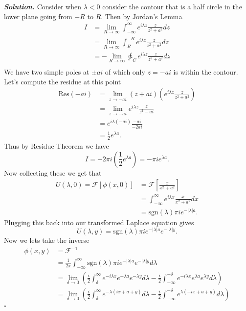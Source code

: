 \documentclass[12pt]{report}
\newenvironment{solution}[1][\it{Solution}]{\textbf{#1. } }{$\square$}
\def\F{{\mathcal{F}}}
\newcommand{\paren}[1]{{\left(#1\right)}} %
\def\ointcc{{\ointctrclockwise}} %
\begin{document}
\begin{solution}
    \noindent
    Consider when $\lambda < 0$ consider the contour that is a half circle in the lower plane going from $-R$ to $R$. Then by Jordan's Lemma
    \begin{align*}
        I &= \lim_{R \to \infty} \int_{-\infty}^{\infty} e^{i\lambda z} \frac{z}{z^2 + a^2}dz\\
        &= \lim_{R \to \infty}\int_{R}^{-R}e^{i\lambda z} \frac{z}{z^2 + a^2}dz\\
        &= - \lim_{R \to \infty} \ointcc_C e^{i\lambda z} \frac{z}{z^2 + a^2}dz\\
    \end{align*} 
    We have two simple poles at $\pm ai$ of which only $z = -ai$ is within the contour. Let's compute the residue at this point
    \begin{align*}
        \text{Res}(-ai) &= \lim_{z \to -ai}(z + ai)\paren{e^{i\lambda z}\frac{z}{z^2 + a^2}}\\
        &= \lim_{z \to -ai} e^{i\lambda z}\frac{z}{z^2 - ai}\\
        &= e^{i\lambda (-ai)}\frac{-ai}{-2ai}\\
        &= \frac{1}{2}e^{\lambda a}.
    \end{align*} 
    Thus by Residue Theorem we have
    \[ 
        I = -2\pi i \paren{ \frac{1}{2}e^{\lambda a}} = -\pi i e^{\lambda a}.
    \]
    Now collecting these we get that
    \begin{align*}
        U(\lambda,0) = \F[\phi(x,0)] &= \F\left[ \frac{x}{x^2 + a^2}\right]\\
        &= \int_{-\infty}^{\infty}e^{i\lambda x}\frac{x}{x^2 + a^2}dx\\
        &= \text{sgn}(\lambda)\pi i e^{-|\lambda| a}.
    \end{align*}
    Plugging this back into our transformed Laplace equation gives
    \[ U(\lambda, y) = \text{sgn}(\lambda)\pi i e^{-|\lambda|a}e^{-|\lambda|y}.\]
    Now we lets take the inverse
    \begin{align*}
        \phi(x,y) &= \F^{-1}\\
        &= \frac{1}{2\pi}\int_{-\infty}^\infty\text{sgn}(\lambda)\pi i e^{-|\lambda|a}e^{-|\lambda|y} d\lambda\\
        &= \lim_{\delta \to 0}\paren{\frac{i}{2}\int_{\delta}^\infty e^{-i\lambda x}e^{-\lambda a}e^{-\lambda y}d\lambda - \frac{i}{2}\int^{-\delta}_{-\infty}e^{-i\lambda x}e^{\lambda a}e^{\lambda y}d\lambda}\\
        &= \lim_{\delta \to 0}\paren{\frac{i}{2}\int_{\delta}^\infty e^{-\lambda(ix + a + y)}d\lambda - \frac{i}{2}\int^{-\delta}_{-\infty}e^{\lambda(-ix + a + y)}d\lambda}\\

\end{align*}
\end{solution}
\end{document}
